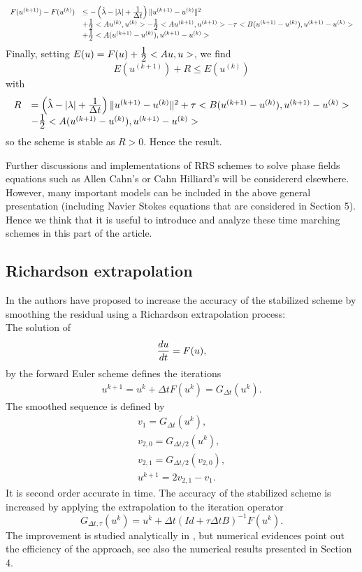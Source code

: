 {\begin{proof_amiens}
$$\begin{array}{ll}
F(u^{(k+1)})-F(u^{(k)})&\le -\left( {\hat \lambda}- |\lambda| +\frac{\textstyle 1} {\textstyle \Delta t} \right)
\|u^{(k+1)}-u^{(k)}\|^2\\\
&+\frac{\textstyle 1} {\textstyle 2}<Au^{(k)},u^{(k)}> - \frac{\textstyle 1} {\textstyle 2}<Au^{(k+1)},u^{(k+1)}>
-\tau <B(u^{(k+1)}-u^{(k)}),u^{(k+1)}-u^{(k)}>\\
&+\frac{\textstyle 1} {\textstyle 2}<A(u^{(k+1)}-u^{(k)}),u^{(k+1)}-u^{(k)}>
  \end{array}
$$
Finally, setting $E(u)=F(u)+\frac{\textstyle 1} {\textstyle 2}<Au,u>$, we find
$$
E(u^{(k+1)})+R \le E(u^{(k)})
$$
with
$$
\begin{array}{ll}
R&=\left( {\hat \lambda}- |\lambda| +\frac{\textstyle 1} {\textstyle \Delta t} \right)
\|u^{(k+1)}-u^{(k)}\|^2 +\tau <B(u^{(k+1)}-u^{(k)}),u^{(k+1)}-u^{(k)}>\\
&-\frac{\textstyle 1} {\textstyle 2}<A(u^{(k+1)}-u^{(k)}),u^{(k+1)}-u^{(k)}>
\end{array}
$$
so the scheme is stable as $R>0$.
Hence the result.
\end{proof_amiens}
Further discussions and implementations of RRS schemes to solve phase fields equations such as Allen Cahn's or Cahn Hilliard's will be considererd elsewhere. However, many important models can be included in the above general presentation (including Navier Stokes equations that are considered in Section 5). Hence we think that it is useful to
introduce and analyze these time marching schemes in this part of the article.
%
\subsection{Richardson extrapolation}
In \cite{AverbuchCohenIsraeli} the authors have proposed to increase
the accuracy of the stabilized scheme by smoothing the residual
using a Richardson extrapolation process:\\
The solution of
\begin{eqnarray*}
\frac{\textstyle d u } {\textstyle dt}=F(u),
\end{eqnarray*}
by the forward Euler scheme defines the iterations
\begin{eqnarray*}
u^{k+1}=u^{k}+\Delta t F(u^k)=G_{\Delta t}(u^k).
\end{eqnarray*}
The smoothed sequence is defined by
\begin{eqnarray*}
v_1=G_{\Delta t}(u^k),\\
v_{2,0}=G_{\Delta t /2}(u^k),\\
v_{2,1}=G_{\Delta t /2}(v_{2,0}),\\
u^{k+1}=2v_{2,1}-v_1.
\end{eqnarray*}
It is second order accurate in time. The accuracy of the stabilized
scheme is increased by applying the extrapolation to the iteration
operator
$$
G_{\Delta t,\tau}(u^k)=u^k +\Delta t (Id +\tau \Delta t
B)^{-1}F(u^k).
$$
The improvement is studied analytically in \cite{RibotSchatzman2}, but
numerical evidences point out the efficiency of the approach, see
also the numerical results presented in Section 4.


}
